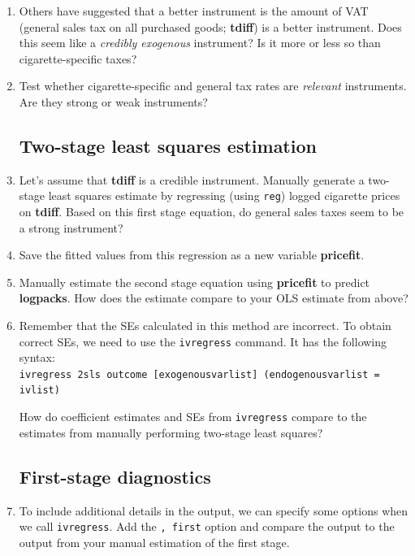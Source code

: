 \documentclass[a4paper,12pt]{article}
\begin{document}
\begin{enumerate}
\item Others have suggested that a better instrument is the amount of VAT (general sales tax on all purchased goods; \textbf{tdiff}) is a better instrument. Does this seem like a {\em credibly exogenous} instrument? Is it more or less so than cigarette-specific taxes?

\item Test whether cigarette-specific and general tax rates are {\em relevant} instruments. Are they strong or weak instruments?

\subsection*{Two-stage least squares estimation}

\item Let's assume that \textbf{tdiff} is a credible instrument. Manually generate a two-stage least squares estimate by regressing (using \texttt{reg}) logged cigarette prices on \textbf{tdiff}. Based on this first stage equation, do general sales taxes seem to be a strong instrument?

\item Save the fitted values from this regression as a new variable \textbf{pricefit}.

\item Manually estimate the second stage equation using \textbf{pricefit} to predict \textbf{logpacks}. How does the estimate compare to your OLS estimate from above?

\item Remember that the SEs calculated in this method are incorrect. To obtain correct SEs, we need to use the \texttt{ivregress} command. It has the following syntax:\\
\texttt{ivregress 2sls outcome [exogenousvarlist] (endogenousvarlist = ivlist)}

How do coefficient estimates and SEs from \texttt{ivregress} compare to the estimates from manually performing two-stage least squares?

\subsection*{First-stage diagnostics}

\item To include additional details in the output, we can specify some options when we call \texttt{ivregress}. Add the \texttt{, first} option and compare the output to the output from your manual estimation of the first stage.


\end{enumerate}
\end{document}
